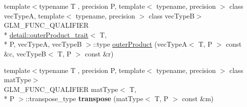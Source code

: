 \begin{DoxyCompactItemize}
\item 
{\footnotesize template$<$typename T , precision P, template$<$ typename, precision $>$ class vec\-Type\-A, template$<$ typename, precision $>$ class vec\-Type\-B$>$ }\\G\-L\-M\-\_\-\-F\-U\-N\-C\-\_\-\-Q\-U\-A\-L\-I\-F\-I\-E\-R \\*
\hyperlink{structglm_1_1detail_1_1outer_product__trait}{detail\-::outer\-Product\-\_\-trait}$<$ T, \\*
P, vec\-Type\-A, vec\-Type\-B $>$\-::type \hyperlink{group__core__func__matrix_gae9f513dc8e4f3ceb993669321b6d0f09}{outer\-Product} (vec\-Type\-A$<$ T, P $>$ const \&c, vec\-Type\-B$<$ T, P $>$ const \&r)
\item 
\hypertarget{namespaceglm_a44eaf0309b3d7a9e71e31b5d4a8dbaab}{{\footnotesize template$<$typename T , precision P, template$<$ typename, precision $>$ class mat\-Type$>$ }\\G\-L\-M\-\_\-\-F\-U\-N\-C\-\_\-\-Q\-U\-A\-L\-I\-F\-I\-E\-R mat\-Type$<$ T, \\*
P $>$\-::transpose\-\_\-type {\bfseries transpose} (mat\-Type$<$ T, P $>$ const \&m)}\label{namespaceglm_a44eaf0309b3d7a9e71e31b5d4a8dbaab}


\end{DoxyCompactItemize}
